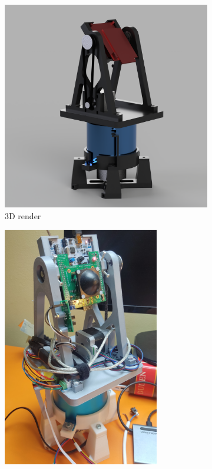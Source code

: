 \begin{figure}[h!]
  \centering
  \begin{subfigure}[b]{0.45\textwidth}
    \centering
    \includegraphics[width=\textwidth]{../img/whole_assembly_2.png}
    \caption{3D render}
  \end{subfigure}
  \hspace{0.05\textwidth} %
  \begin{subfigure}[b]{0.45\textwidth}
    \centering
    \includegraphics[width=0.75\textwidth]{../img/assembly_photo.jpg}

\end{subfigure}
\end{figure}
